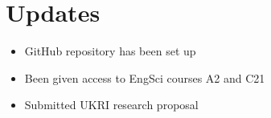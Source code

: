 \documentclass{article}
\begin{document}
\section{Updates}

{\color{violet}
\begin{itemize}
    \item GitHub repository has been set up
    \item Been given access to EngSci courses A2 and C21
    \item Submitted UKRI research proposal
\end{itemize}
}
\end{document}
